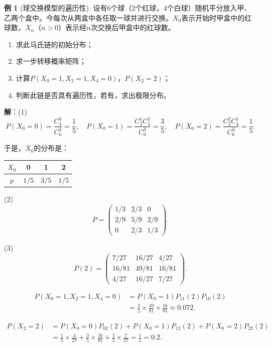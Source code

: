 \documentclass[11pt,a4paper]{report}
\theoremstyle{definition}
\newtheorem{example}{例}[chapter]
\begin{document}
\begin{example}[球交换模型的遍历性]
设有6个球（2个红球，4个白球）随机平分放入甲、乙两个盒中。今每次从两盒中各任取一球并进行交换。$X_0$表示开始时甲盒中的红球数，$X_n$（$n>0$）表示经$n$次交换后甲盒中的红球数。
\begin{enumerate}[label=(\arabic*)]
    \item 求此马氏链的初始分布；
    \item 求一步转移概率矩阵；
    \item 计算$P(X_0=1,X_2=1,X_4=0)$，$P(X_2=2)$；
    \item 判断此链是否具有遍历性，若有，求出极限分布。
\end{enumerate}

\textbf{解}：(1)
\[
P(X_0=0)=\frac{C_4^3}{C_6^3}=\frac{1}{5},\quad
P(X_0=1)=\frac{C_2^1C_4^2}{C_6^3}=\frac{3}{5},\quad
P(X_0=2)=\frac{C_2^2C_4^1}{C_6^3}=\frac{1}{5}.
\]

于是，$X_0$的分布是：
\begin{table}[htbp]
\centering
\begin{tabular}{@{}cccc@{}}
\toprule
$X_0$ & 0 & 1 & 2 \\
\midrule
$p$ & $1/5$ & $3/5$ & $1/5$ \\
\bottomrule
\end{tabular}
\end{table}

(2)
\[
P=
\begin{pmatrix}
1/3 & 2/3 & 0\\
2/9 & 5/9 & 2/9\\
0 & 2/3 & 1/3
\end{pmatrix}.
\]

(3)
\[
P(2)=
\begin{pmatrix}
7/27 & 16/27 & 4/27\\
16/81 & 49/81 & 16/81\\
4/27 & 16/27 & 7/27
\end{pmatrix}.
\]

\begin{align*}
P(X_0=1,X_2=1,X_4=0)&=P(X_0=1)P_{11}(2)P_{10}(2)\\
&=\frac{3}{5}\times\frac{49}{81}\times\frac{16}{81}\approx0.072.
\end{align*}

\begin{align*}
P(X_2=2)&=P(X_0=0)P_{02}(2)+P(X_0=1)P_{12}(2)+P(X_0=2)P_{22}(2)\\
&=\frac{1}{5}\times\frac{4}{27}+\frac{3}{5}\times\frac{16}{81}+\frac{1}{5}\times\frac{7}{27}=\frac{1}{5}=0.2.
\end{align*}


\end{example}
\end{document}
